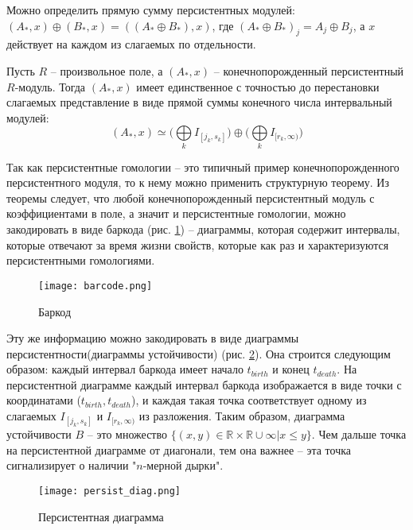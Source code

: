 Можно определить прямую сумму персистентных модулей: $ (A_*, x) \oplus (B_*, x) = ((A_* \oplus B_*), x) $, где $(A_* \oplus B_*)_j = A_j \oplus B_j$, а $x$ действует на каждом из слагаемых по отдельности.
\begin{theorem*} Пусть $R$ -- произвольное поле, а $(A_*, x)$ -- конечнопорожденный персистентный $R$-модуль. Тогда $(A_*, x)$ имеет единственное с точностью до перестановки слагаемых представление в виде прямой суммы конечного числа интервальный модулей:
	\[
		(A_*, x) \simeq \big( \bigoplus\limits_{k} I_{[j_k, s_k]} \big) 
																		\oplus 
						\big( \bigoplus\limits_{k} I_{[r_k, \infty)} \big)
	\]
\end{theorem*}

Так как персистентные гомологии -- это типичный пример конечнопорожденного персистентного модуля, то к нему можно применить структурную теорему. Из теоремы следует, что любой конечнопорожденный персистентный модуль с коэффициентами в поле, а значит и персистентные гомологии, можно закодировать в виде баркода (рис. \ref{barcode}) -- диаграммы, которая содержит интервалы, которые отвечают за время жизни свойств, которые как раз и характеризуются персистентными гомологиями.
\begin{figure}[]
	\begin{center}
		\texttt{[image: barcode.png]}\\
		\caption{Баркод}
		\label{barcode}
	\end{center}
\end{figure}
\newline
Эту же информацию можно закодировать в виде диаграммы персистентности(диаграммы устойчивости) (рис. \ref{persist_diag}). Она строится следующим образом: каждый интервал баркода имеет начало $t_{birth}$ и конец $t_{death}$. На персистентной диаграмме каждый интервал баркода изображается в виде точки с координатами ($t_{birth}, t_{death}$), и каждая такая точка соответствует одному из слагаемых $I_{[j_k, s_k]}$ и $I_{[r_k, \infty)} $ из разложения. Таким образом, диаграмма устойчивости $B$ -- это множество $\{ (x,y) \in \mathbb{R} \times \mathbb{R} \cup \infty | x \leq y\}$. Чем дальше точка на персистентной диаграмме от диагонали, тем она важнее -- эта точка сигнализирует о наличии "$n$-мерной дырки". 
\begin{figure}[]
	\begin{center}
		\texttt{[image: persist\_diag.png]}\\
		\caption{Персистентная диаграмма}
		\label{persist_diag}
	\end{center}
\end{figure}

